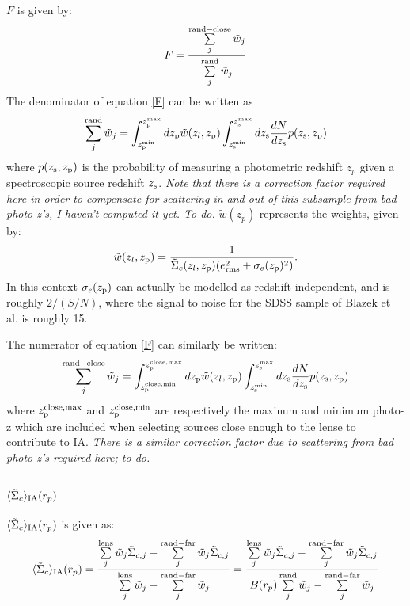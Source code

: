 \documentclass[onecolumn,amsmath,aps,fleqn, superscriptaddress]{revtex4}
\begin{document}
$F$ is given by:
\begin{equation}
F= \frac{\sum\limits_{j}^{\rm rand-close}\tilde{w}_j}{\sum\limits_{j}^{\rm rand} \tilde{w}_j} 
\label{F}
\end{equation}
The denominator of equation \ref{F} can be written as
\begin{equation}
\sum\limits_{j}^{\rm rand} \tilde{w}_j = \int_{z_{\rm p}^{\rm min}}^{z_{\rm p}^{\rm max}} d z_{\rm p} \tilde{w}(z_l, z_{\rm p}) \int_{z_{\rm s}^{\rm min}}^{z_{\rm s}^{\rm max}} dz_{\rm s} \frac{dN}{dz_{\rm s}} p(z_{\rm s}, z_{\rm p})
\label{sumrandweights}
\end{equation}
where $p(z_{\rm s}, z_{\rm p})$ is the probability of measuring a photometric redshift $z_p$ given a spectroscopic source redshift $z_{\rm s}$. {\it Note that there is a correction factor required here in order to compensate for scattering in and out of this subsample from bad photo-z's, I haven't computed it yet. To do.} $\tilde{w}(z_p)$ represents the weights, given by:
\begin{equation}
\tilde{w}(z_l, z_{\rm p}) = \frac{1}{\tilde{\Sigma}_c(z_l, z_{\rm p})(e_{\rm rms}^2 + \sigma_e(z_{\rm p})^2)}.
\label{weights}
\end{equation}
In this context $\sigma_e(z_{\rm p})$ can actually be modelled as redshift-independent, and is roughly $2 / (S/N)$, where the signal to noise for the SDSS sample of Blazek et al. is roughly 15. 

The numerator of equation \ref{F} can similarly be written:
\begin{equation}
\sum\limits_{j}^{\rm rand-close}\tilde{w}_j = \int_{z_{\rm p}^{\rm close,min}}^{z_{\rm p}^{\rm close,max}} d z_{\rm p} \tilde{w}(z_l, z_{\rm p}) \int_{z_{\rm s}^{\rm min}}^{z_{\rm s}^{\rm max}} dz_{\rm s} \frac{dN}{dz_{\rm s}} p(z_{\rm s}, z_{\rm p})
\label{sumrandcloseweights}
\end{equation}
where $z_{\rm p}^{\rm close,max}$ and $z_{\rm p}^{\rm close,min}$ are respectively the maxinum and minimum photo-z which are included when selecting sources close enough to the lense to contribute to IA. {\it There is a similar correction factor due to scattering from bad photo-z's required here; to do.}

\subsection*{$\langle \tilde{\Sigma}_c\rangle_{\rm IA}(r_p)$}

$\langle \tilde{\Sigma}_c\rangle_{\rm IA}(r_p)$ is given as:
\begin{equation}
\langle \tilde{\Sigma}_c\rangle_{\rm IA} (r_p) = \frac{\sum\limits_{j}^{\rm lens} \tilde{w}_j \tilde{\Sigma}_{c,j}- \sum\limits_{j}^{\rm rand-far} \tilde{w}_j \tilde{\Sigma}_{c,j}}{\sum\limits_{j}^{\rm lens} \tilde{w}_j - \sum\limits_{j}^{\rm rand-far} \tilde{w}_j} = \frac{\sum\limits_{j}^{\rm lens} \tilde{w}_j \tilde{\Sigma}_{c,j}- \sum\limits_{j}^{\rm rand-far} \tilde{w}_j \tilde{\Sigma}_{c,j}}{B(r_p)\sum\limits_{j}^{\rm rand} \tilde{w}_j - \sum\limits_{j}^{\rm rand-far} \tilde{w}_j}
\label{SigmaIA}
\end{equation}
\end{document}
